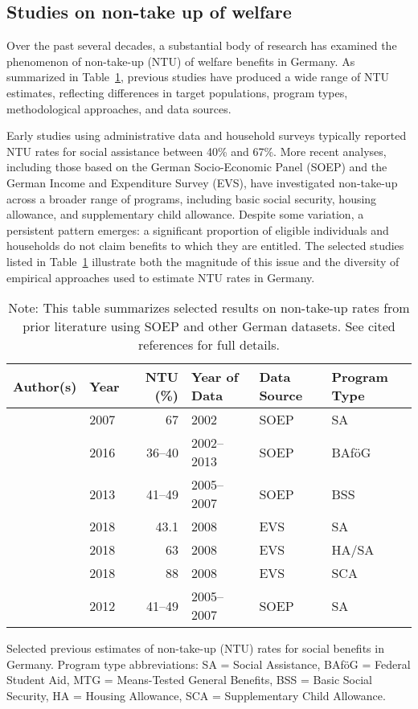 \subsection{Studies on non-take up of welfare}

Over the past several decades, a substantial body of research has examined the phenomenon of non-take-up (NTU) of welfare benefits in Germany. 
As summarized in Table~\ref{table:NTU-studies}, previous studies have produced a wide range of NTU estimates, reflecting differences in target populations, program types, methodological approaches, and data sources. 

Early studies using administrative data and household surveys typically reported NTU rates for social assistance between 40\% and 67\%. 
More recent analyses, including those based on the German Socio-Economic Panel (SOEP) and the German Income and Expenditure Survey (EVS), have investigated non-take-up across a broader range of programs, including basic social security, housing allowance, and supplementary child allowance. 
Despite some variation, a persistent pattern emerges: a significant proportion of eligible individuals and households do not claim benefits to which they are entitled. 
The selected studies listed in Table~\ref{table:NTU-studies} illustrate both the magnitude of this issue and the diversity of empirical approaches used to estimate NTU rates in Germany.

\begin{table}[htbp]
\centering
\begin{tabular}{llrlll}
\toprule
\textbf{Author(s)} & \textbf{Year} & \textbf{NTU (\%)} & \textbf{Year of Data} & \textbf{Data Source} & \textbf{Program Type} \\
\midrule
\citeauthor{frick_claim_2007} & 2007 & 67 & 2002 & SOEP & SA \\
\citeauthor{herber_non-take-up_2019} & 2016 & 36--40 & 2002--2013 & SOEP & BAföG \\
\citeauthor{RePEc:iab:iabfob:201305} & 2013 & 41--49 & 2005--2007 & SOEP & BSS \\
\citeauthor{bruckmeier_benefit_2018} & 2018 & 43.1 & 2008 & EVS & SA \\
\citeauthor{bruckmeier_benefit_2018} & 2018 & 63 & 2008 & EVS & HA/SA \\
\citeauthor{bruckmeier_benefit_2018} & 2018 & 88 & 2008 & EVS & SCA \\
\citeauthor{bruckmeier_new_2012}  & 2012 & 41--49 & 2005--2007 & SOEP & SA \\
\bottomrule
\end{tabular}
\caption{Selected previous estimates of non-take-up (NTU) rates for social benefits in Germany. Program type abbreviations: SA = Social Assistance, BAföG = Federal Student Aid, MTG = Means-Tested General Benefits, BSS = Basic Social Security, HA = Housing Allowance, SCA = Supplementary Child Allowance.}
\caption*{\small{Note: This table summarizes selected results on non-take-up rates from prior literature using SOEP and other German datasets. See cited references for full details.}}
\label{table:NTU-studies}
\end{table}


